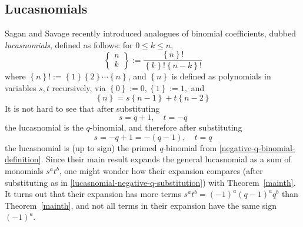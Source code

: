 \documentclass[10pt]{amsart}
\theoremstyle{plain}
\theoremstyle{definition}
\theoremstyle{remark}
\numberwithin{equation}{section}
\begin{document}
\subsection{Lucasnomials}
Sagan and Savage \cite{SaganSavage}
recently introduced analogues
of binomial coefficients, dubbed {\it lucasnomials}, defined
as follows:  for $0 \leq k \leq n$, 
$$
\left\{ \begin{matrix} n \\ k \end{matrix} \right\}:=
\frac{ \left\{ n \right\}! }
      {  \left\{ k \right\}! \left\{ n-k \right\}! }
$$
where $\left\{ n \right\}!:=
\left\{ 1 \right\} \left\{ 2 \right\} \cdots \left\{ n \right\}$,
and 
$\left\{ n \right\}$ is defined as polynomials in variables $s,t$ 
recursively, via
$
\left\{ 0 \right\}:=0 ,
\left\{ 1 \right\}:=1 ,
$
and
$$
\left\{ n \right\}
 =s \left\{ n - 1 \right\} + t \left\{ n - 2 \right\}
$$
It is not hard to see that after substituting
$$
s=q+1, \quad t=-q
$$ 
the lucasnomial is the $q$-binomial, and therefore after substituting 
\begin{equation}
\label{lucasnomial-negative-q-substitution}
s=-q+1=-(q-1), \quad t=q
\end{equation} 
the lucasnomial is (up to sign) the primed $q$-binomial
from \eqref{negative-q-binomial-definition}.
Since their main result \cite[Theorem 3.1]{SaganSavage} expands the general 
lucasnomial as a sum of monomials $s^a t^b$, 
one might wonder how their expansion
compares (after substituting as in \eqref{lucasnomial-negative-q-substitution})
with Theorem~\ref{mainth}.  It turns out that their
expansion has more terms $s^a t^b=(-1)^a (q-1)^a q^b$
than Theorem~\ref{mainth}, and not all terms in their expansion
have the same sign $(-1)^a$.
\end{document}
